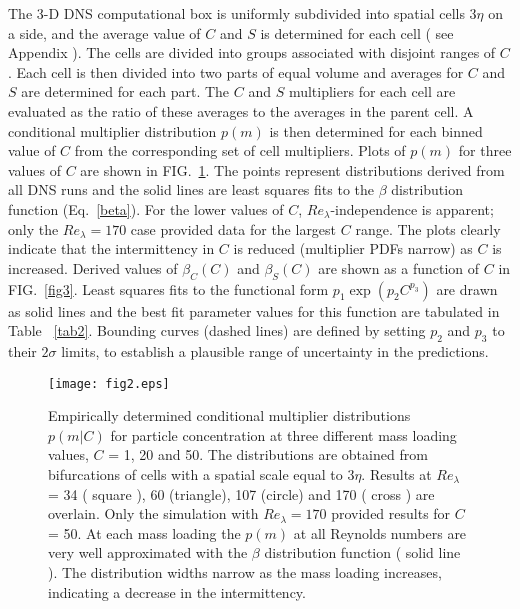 \documentclass[aps,pra,twocolumn,groupedaddress,showkeys,showpacs,floatfix]{revtex4}
\begin{document}
 The 3-D DNS computational box  is uniformly subdivided into spatial cells
$3\eta$ on a side, and the average  value of $C$ and $S$ is determined for each
cell ( see Appendix ).  The cells are divided into groups associated with disjoint ranges of
$C$.  Each cell is then divided into two parts of equal volume  
and averages for $C$ and $S$ are determined for each
part.  The $C$ and $S$ multipliers for each cell are evaluated as the ratio of
these averages  to the averages in the parent cell.  
A conditional multiplier
distribution $p(m)$ is then determined for each binned value of $C$ from the
corresponding set of cell multipliers.  Plots of $p(m)$ for three values of $C$
are shown in FIG.~\ref{fig2}. The points  represent distributions derived from all DNS
runs and the solid lines are least squares  fits to the $\beta$ distribution
function (Eq.~\ref{beta}). For the lower values of $C$,
$Re_\lambda$-independence is apparent; only the $Re_\lambda = 170$ case
provided data for the largest $C$ range. The plots clearly indicate that  the
intermittency in $C$ is reduced (multiplier PDFs narrow) as $C$ is increased.
Derived values of $\beta_C(C)$ and $\beta_S(C)$ are shown as a function of $C$
in FIG.~\ref{fig3}.  Least squares fits to the functional form $p_1\exp(p_2C^{p_3})$
are drawn as solid lines and the best fit parameter values for this function
are tabulated in Table ~\ref{tab2}. Bounding curves (dashed lines) are defined by
setting $p_2$ and $p_3$ to their $2\sigma$ limits, to establish a plausible
range of uncertainty in the predictions. 



\begin{figure}[h]
\begin{center}
\texttt{[image: fig2.eps]}
\caption{\label{fig2} Empirically determined conditional multiplier distributions $p(m|C)$ for  
   particle concentration at three different      mass loading values, $C$ = 1,
20 and 50. The distributions are obtained from bifurcations of      cells with
a spatial scale equal      to $3\eta$.      Results at $Re_{\lambda}$  = 34 (
square ), 60 (triangle),      107 (circle) and 170 ( cross ) are overlain. Only
the simulation with $Re_{\lambda} = 170$ provided results for  $C$ = 50. At
each mass loading      the $p(m)$ at all Reynolds numbers are very well
approximated      with the $\beta$ distribution function ( solid line ).     
The distribution widths narrow as the mass loading increases,      indicating a
decrease in the intermittency.
}
\end{center}
\end{figure}
\end{document}
